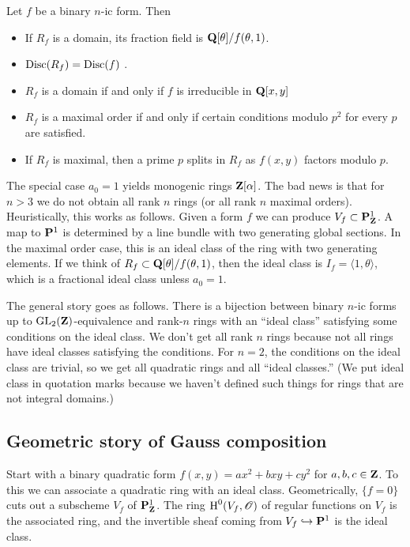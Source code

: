 \begin{prop}
Let $f$ be a binary $n$-ic form. Then 
\begin{itemize}
  \item If $R_f$ is a domain, its fraction field is $\mathbf{Q}[\theta]/f(\theta,1)$. 
  \item $\operatorname{Disc}(R_f) = \operatorname{Disc}(f)$ .
  \item $R_f$ is a domain if and only if $f$ is irreducible in $\mathbf{Q}[x,y]$ 
  \item $R_f$ is a maximal order if and only if certain conditions modulo $p^2$  
    for every $p$ are satisfied. 
  \item If $R_f$ is maximal, then a prime $p$ splits in $R_f$ as $f(x,y)$ 
    factors modulo $p$. 
\end{itemize}
\end{prop}

The special case $a_0=1$ yields monogenic rings $\mathbf{Z}[\alpha]$. The bad news is 
that for $n>3$ we do not obtain all rank $n$ rings (or all rank $n$ maximal 
orders). Heuristically, this works as follows. Given a form $f$ we can produce 
$V_f\subset \mathbf{P}_{\mathbf{Z}}^1$. A map to $\mathbf{P}^1$ is determined by a line bundle with 
two generating global sections. In the maximal order case, this is an ideal 
class of the ring with two generating elements. If we think of 
$R_f\subset \mathbf{Q}[\theta]/f(\theta,1)$, then the ideal class is 
$I_f=\langle 1,\theta\rangle$, which is a fractional ideal class unless 
$a_0=1$. 

The general story goes as follows. There is a bijection between binary $n$-ic 
forms up to $\operatorname{GL}_2(\mathbf{Z})$-equivalence and rank-$n$ rings with 
an ``ideal class'' satisfying some conditions on the ideal class. We don't 
get all rank $n$ rings because not all rings have ideal classes satisfying the 
conditions. For $n=2$, the conditions on the ideal class are trivial, so we 
get all quadratic rings and all ``ideal classes.'' (We put ideal class in 
quotation marks because we haven't defined such things for rings that are not 
integral domains.) 





\subsection{Geometric story of Gauss composition}

Start with a binary quadratic form $f(x,y)=a x^2 + b x y + c y^2$ for 
$a,b,c\in \mathbf{Z}$. To this we can associate a quadratic ring with an ideal class. 
Geometrically, $\{f=0\}$ cuts out a subscheme $V_f$ of $\mathbf{P}_{\mathbf{Z}}^1$. The ring 
$\operatorname{H}^0(V_f,\mathscr{O})$ of regular functions on $V_f$ is the associated ring, and the 
invertible sheaf coming from $V_f \hookrightarrow \mathbf{P}^1$ is the ideal class. 

